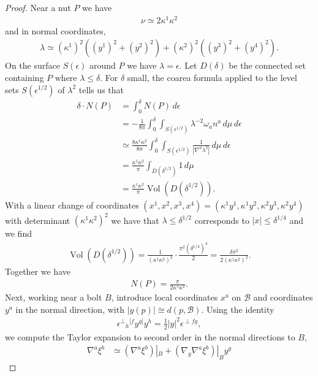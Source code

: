 \documentclass[a4paper,10pt,reqno]{amsart}
\newcommand{\nut}{P}
\newcommand{\bolt}{B}
\newcommand{\cB}{\mathcal{B}}
\theoremstyle{plain}
\numberwithin{equation}{section}
\newcommand{\eps}{\epsilon}
\begin{document}
\begin{proof}
Near a nut $\nut$ we have
\begin{align}
\nu \simeq 2 \kappa^1 \kappa^2
\end{align}
and in normal coordinates,
\begin{align}
\lambda \simeq 
(\kappa^1)^2 \left( (y^1)^2 + (y^2)^2 \right)
+ (\kappa^2)^2 \left( (y^3)^2 + (y^4)^2 \right).
\end{align}
On the surface $S(\eps)$ around $\nut$ we have $\lambda = \eps$. Let $D(\delta)$ be the connected set containing $\nut$ where $\lambda \leq \delta$. For $\delta$ small, the coarea formula  applied to the level sets $S(\eps^{1/2})$ of $\lambda^2$ tells us that
\begin{align}
\delta \cdot N(\nut)
&= \int_0^\delta N(\nut) \, d\epsilon \\
&= -\frac{1}{8\pi} \int_0^\delta 
\int_{S(\eps^{1/2})} \lambda^{-2} \omega_a n^a \, d\mu 
\, d\epsilon \\
&\simeq 
\frac{8 \kappa^1 \kappa^2}{8\pi} \int_0^\delta 
\int_{S(\eps^{1/2})} \frac{1}{|\nabla^a \lambda^2|} \, d\mu
\, d\epsilon \\
&= 
\frac{\kappa^1 \kappa^2}{\pi} \int_{D(\delta^{1/2})} 1 \, d\mu \\
&= 
\frac{\kappa^1 \kappa^2}{\pi} \operatorname{Vol}(D(\delta^{1/2})).
\end{align} 
With a linear change of coordinates $(x^1,x^2,x^3,x^4) = (\kappa^1 y^1,\kappa^1 y^2,\kappa^2 y^3,\kappa^2 y^4)$ with determinant $(\kappa^1 \kappa^2)^2$ we have that $\lambda \leq \delta^{1/2}$ corresponds to $|x| \leq \delta^{1/4}$ and we find 
\begin{align}
\operatorname{Vol}(D(\delta^{1/2})) 
= \frac{1}{(\kappa^1 \kappa^2)^2} \cdot \frac{\pi^2(\delta^{1/4})^4}{2}
= \frac{\delta \pi^2}{2(\kappa^1 \kappa^2)^2}.
\end{align}
Together we have 
\begin{align}
N(\nut) = \frac{\pi}{2\kappa^1 \kappa^2}.
\end{align}
%
Next, working near a bolt $\bolt$, introduce local coordinates $x^a$ on $\cB$ and coordinates $y^a$ in the normal direction, with $|y(p)| \cong d(p,\cB)$. Using the identity 
\begin{align}
\eps^{\perp}{}_h{}^{[f} y^{g]} y^h = \frac{1}{2} |y|^2 \eps^{\perp fg},
\end{align}
we compute the Taylor expansion to second order in the normal directions to $\bolt$,
\begin{align}
\nabla^a \xi^b 
&\simeq 
(\nabla^a \xi^b)|_\bolt + (\nabla_g \nabla^a \xi^b)|_\bolt y^g

\end{align}
\end{proof}
\end{document}
